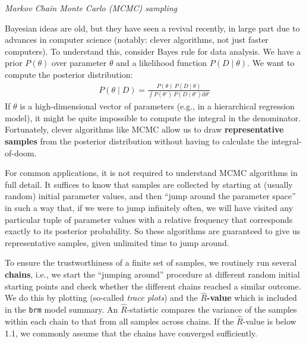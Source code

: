 \documentclass[nobib]{tufte-handout}
\begin{document}
\begin{InfoBox}[]
\centering
\colorbox{mygray}{\centering
  \begin{minipage}{1\textwidth}

    \emph{Markov Chain Monte Carlo (MCMC) sampling}
    \medskip
 
    Bayesian ideas are old, but they have seen a revival recently, in large part due to
    advances in computer science (notably: clever algorithms, not just faster computers). To
    understand this, consider Bayes rule for data analysis. We have a prior $P(\theta)$ over
    parameter $\theta$ and a likelihood function $P(D\mid\theta)$. We want to compute
    the posterior distribution:
    \begin{eqnarray*}
      P(\theta \mid D) = \frac{P(\theta) \ P(D \mid \theta)}{ \int P(\theta') \ P(D \mid
      \theta') \textrm{d}\theta'}
    \end{eqnarray*}
    If $\theta$ is a high-dimensional vector of parameters (e.g., in a hierarchical regression model), it
    might be quite impossible to compute the integral in the denominator. Fortunately, clever
    algorithms like MCMC allow us to draw \textbf{representative samples} from the
    posterior distribution without having to calculate the integral-of-doom.

    \medskip
    
    For common applications, it is not required to understand MCMC algorithms in full detail.
    It suffices to know that samples are collected by starting at (usually random) initial
    parameter values, and then ``jump around the parameter space'' in such a way that, if we
    were to jump infinitely often, we will have visited any particular tuple of parameter
    values with a relative frequency that corresponds exactly to its posterior probability. So
    these algorithms are guaranteed to give us representative samples, given unlimited time to
    jump around.

    \medskip
    
    To ensure the trustworthiness of a finite set of samples, we routinely run several
    \textbf{chains}, i.e., we start the ``jumping around'' procedure at different random
    initial starting points and check whether the different chains reached a similar outcome.
    We do this by plotting (so-called \emph{trace plots}) and the \textbf{$\hat{R}$-value}
    which is included in the \texttt{brm} model summary. An $\hat{R}$-statistic compares the
    variance of the samples within each chain to that from all samples across chains. If the
    $\hat{R}$-value is below 1.1, we commonly assume that the chains have converged
    sufficiently.


\end{minipage}}
\end{InfoBox}
\end{document}
